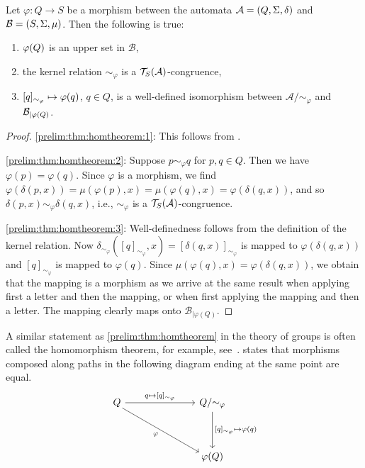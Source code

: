 \begin{theorem} 
	\label{prelim:thm:homtheorem}
	Let $\varphi \colon Q \to S$ be a morphism
	between the automata $\mathcal A = (Q, \Sigma, \delta)$
	and $\mathcal B = (S, \Sigma, \mu)$.
	Then the following is true:
	\begin{enumerate} 
	\item \label{prelim:thm:homtheorem:1} $\varphi(Q)$ is an upper set in $\mathcal B$,
	
	\item \label{prelim:thm:homtheorem:2} the kernel relation $\sim_{\varphi}$
	is a $\mathcal T_S(\mathcal A)$-congruence,
	
	\item \label{prelim:thm:homtheorem:3} $[q]_{\sim_{\varphi}} \mapsto \varphi(q)$, $q \in Q$,
	is a well-defined isomorphism between
	$\mathcal A / {\sim_{\varphi}}$ and~$\mathcal B_{|\varphi(Q)}$.
	\end{enumerate}
\end{theorem}
\begin{proof}
\ref{prelim:thm:homtheorem:1}: This follows from .

\ref{prelim:thm:homtheorem:2}: Suppose $p \sim_{\varphi} q$ for $p,q \in Q$.
 Then we have $\varphi(p) = \varphi(q)$.
 Since $\varphi$ is a morphism,
 we find $\varphi(\delta(p, x)) = \mu(\varphi(p), x) = \mu(\varphi(q), x) = \varphi(\delta(q, x))$,
 and so $\delta(p, x) \sim_{\varphi} \delta(q, x)$, i.e., $\sim_{\varphi}$
 is a $\mathcal T_S(\mathcal A)$-congruence.
 
\ref{prelim:thm:homtheorem:3}: Well-definedness follows from the definition of the kernel relation.
 Now $\delta_{\sim_{\varphi}}([q]_{\sim_{\varphi}}, x) = [\delta(q, x)]_{\sim_{\varphi}}$ 
 is mapped to $\varphi(\delta(q, x))$
 and $[q]_{\sim_{\varphi}}$ is mapped to $\varphi(q)$.
 Since $\mu(\varphi(q), x) = \varphi(\delta(q, x))$,
 we obtain that the mapping is a morphism
 as we arrive at the same result when applying first a letter and then the mapping,
 or when first applying the mapping and then a letter.
 The mapping clearly maps onto $\mathcal B_{|\varphi(Q)}$.
\end{proof}

A similar statement as \cref{prelim:thm:homtheorem} in the theory of groups is often called the 
homomorphism theorem, for example, see~\cite[Sect.~1.2.5]{Kurzweil04}.
 states that morphisms composed along paths in the following diagram
ending at the same point are equal.
\[
\begin{tikzcd}[row sep=1.3cm, column sep=2.5cm]
	Q \arrow{r}{q \mapsto [q]_{\sim_{\varphi}}}
	\arrow[swap,
	start anchor={[shift={(-3pt,3pt)}]south east}, %
	end anchor={[shift={(2pt,-4pt)}]north west} %
	]{dr}{\varphi}
	& Q / {\sim_{\varphi}} \arrow{d}{[q]_{\sim_{\varphi}} \mapsto \varphi(q)} \\
	& \varphi(Q) 
\end{tikzcd}
\]

